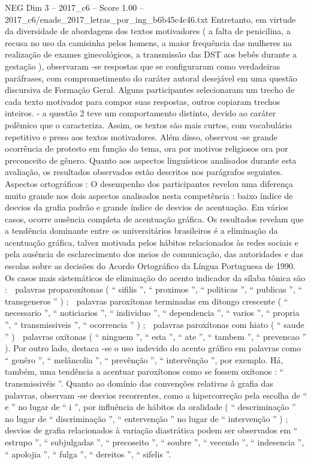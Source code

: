 \begin{textsample}{NEG Dim 3 – 2017\_c6 – Score 1.00 – 2017\_c6/enade\_2017\_letras\_por\_ing\_b6b45c4c46.txt}
Entretanto, em virtude da diversidade de abordagens dos textos motivadores ( a falta de penicilina, a recusa no uso da camisinha pelos homens, a maior frequência das mulheres na realização de exames ginecológicos, a transmissão das DST aos bebês durante a gestação ), observaram -se respostas que se configuraram como verdadeiras paráfrases, com comprometimento do caráter autoral desejável em uma questão discursiva de Formação Geral.
Alguns participantes selecionaram um trecho de cada texto motivador para compor suas respostas, outros copiaram trechos inteiros. - a questão 2 teve um comportamento distinto, devido ao caráter polêmico que o caracteriza.
Assim, os textos são mais curtos, com vocabulário repetitivo e preso aos textos motivadores.
Além disso, observou -se grande ocorrência de protesto em função do tema, ora por motivos religiosos ora por preconceito de gênero.
Quanto aos aspectos linguísticos analisados durante esta avaliação, os resultados observados estão descritos nos parágrafos seguintes.
Aspectos ortográficos : O desempenho dos participantes revelou uma diferença muito grande nos dois aspectos analisados nesta competência : baixo índice de desvios da grafia padrão e grande índice de desvios de acentuação.
Em vários casos, ocorre ausência completa de acentuação gráfica.
Os resultados revelam que a tendência dominante entre os universitários brasileiros é a eliminação da acentuação gráfica, talvez motivada pelos hábitos relacionados às redes sociais e pela ausência de esclarecimento dos meios de comunicação, das autoridades e das escolas sobre as decisões do Acordo Ortográfico da Língua Portuguesa de 1990.
Os casos mais sistemáticos de eliminação do acento indicador da sílaba tônica são :  palavras proparoxítonas ( “ sifilis ”, “ proximos ”, “ politicas ”, “ publicas ”, “ transgeneros ” ) ;  palavras paroxítonas terminadas em ditongo crescente ( “ necessario ”, “ noticiarios ”, “ individuo ”, “ dependencia ”, “ varios ”, “ propria ”, “ transmissiveis ”, “ ocorrencia ” ) ;  palavras paroxítonas com hiato ( “ saude ” )  palavras oxítonas ( “ ninguem ”, “ esta ”, “ ate ”, “ tambem ”, “ prevencao ” ).
Por outro lado, destaca -se o uso indevido do acento gráfico em palavras como “ genêro ”, “ melâncolia ”, “ prevênção ”, “ intervênção ”, por exemplo.
Há, também, uma tendência a acentuar paroxítonos como se fossem oxítonos : “ transmissivéis ”.
Quanto ao domínio das convenções relativas à grafia das palavras, observam -se desvios recorrentes, como a hipercorreção pela escolha de “ e ” no lugar de “ i ”, por influência de hábitos da oralidade ( “ descriminação ” no lugar de “ discriminação ”, “ entervenção ” no lugar de “ intervenção ” ) ; desvios de grafia relacionados à variação diastrática podem ser observados em “ estrupo ”, “ subjulgadas ”, “ precoseito ”, “ soubre ”, “ vecendo ”, “ indesencia ”, “ apolojia ”, “ fulga ”, “ dereitos ”, “ sifelis ”.

\end{textsample}

